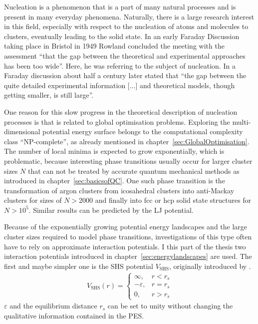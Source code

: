 Nucleation is a phenomenon that is a part of many natural processes and is
present in many everyday phenomena. Naturally, there is a large research
interest in this field, especially with respect to the nucleation of atoms and
molecules to clusters, eventually leading to the solid
state.\autocite{Stillinger_Packingstructurestransitions_1984,
Martin-1996,Wales-1996, Vlieg_atomicscaleunderstandingcrystal_2007, Arkus-2010,
Woodley-2010, Karthika-2016, Holmes-Cerfon_StickySphereClusters_2017} In an
early Faraday Discussion taking place in Bristol in 1949 Rowland concluded the
meeting with the assessment ``that the gap between the theoretical and
experimental approaches has been too wide''.\autocite{Rowland-1949} Here, he was
referring to the subject of nucleation. In a Faraday discussion about half a
century later \citeauthor{Vlieg_atomicscaleunderstandingcrystal_2007} stated
that ``the gap between the quite detailed experimental information [...] and
theoretical models, though getting smaller, is still
large''.\autocite{Vlieg_atomicscaleunderstandingcrystal_2007}

One reason for this slow progress in the theoretical description of nucleation
processes is that is related to global optimisation problems. Exploring the
multi-dimensional potential energy surface belongs to the computational
complexity class ``NP-complete'', as already mentioned in
chapter~\ref{sec:GlobalOptimisation}. The number of local minima is expected to
grow exponentially,\autocite{Stillinger_Packingstructurestransitions_1984,
Oganov-2006, Massen_Powerlawdistributionsareas_2007, wales10, Oganov-2011,
calvo12, Wales-2015} which is problematic, because interesting phase transitions
usually occur for larger cluster sizes $N$ that can not be treated by accurate
quantum mechanical methods as introduced in chapter~\ref{sec:basicsofQC}. One
such phase transition is the transformation of argon clusters from icosahedral
clusters into anti-Mackay clusters for sizes of $N>2000$ and finally into
\acf{fcc} or \acf{hcp} solid state structures for
$N>10^5$.\autocite{Krainyukova-2012} Similar results can be predicted by the
\acf{LJ} potential.\autocite{Martin-1996,
Schwerdtfeger_ExtensionLennardJonespotential_2006, Krainyukova-2007}

Because of the exponentially growing potential energy landscapes and the large
cluster sizes required to model phase transitions, investigations of this type
often have to rely on approximate interaction potentials. I this part of the
thesis two interaction potentials introduced in
chapter~\ref{sec:energylandscapes} are used. The first and maybe simpler one is
the \acf{SHS} potential $V_\mathrm{SHS}$, originally introduced by
\citeauthor{baxter68}\autocite{baxter68}.
%
\begin{align}
    V_\mathrm{SHS}(r)=\begin{cases}
        \infty, & r < r_s\\
        -\varepsilon, & r = r_s\\
        0, & r > r_s
    \end{cases}
\label{eqn:KS}
\end{align}
%
$\varepsilon$ and the equilibrium distance $r_s$ can be set to unity without
changing the qualitative information contained in the \ac{PES}. 

